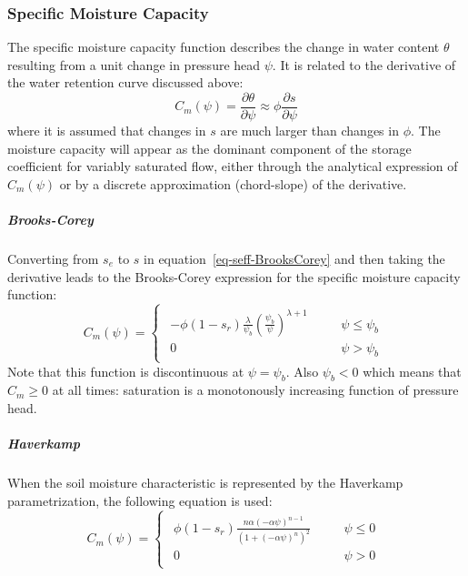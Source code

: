 \documentclass[fleqn]{article}
\begin{document}
\subsubsection{Specific Moisture Capacity}
The specific moisture capacity function describes the change in water content
$\theta$ resulting from a unit change in pressure head $\psi$. It is related to the derivative of the water retention curve discussed above:
\begin{equation}
  C_m(\psi) = \frac{\partial \theta}{\partial \psi} \approx
  \phi \frac{\partial s}{\partial \psi}
\end{equation}
where it is assumed that changes in $s$ are much larger than changes in $\phi$.
The moisture capacity will appear as the dominant component of the storage
coefficient for variably saturated flow, either through the analytical expression
of $C_m(\psi)$ or by a discrete approximation (chord-slope) of the derivative.

\subparagraph{Brooks-Corey}
Converting from $s_e$ to $s$ in equation~\ref{eq-seff-BrooksCorey} and then taking the derivative leads to the Brooks-Corey expression for the specific moisture capacity function:
\begin{equation}
  C_m(\psi) =
  \begin{cases}
    \begin{aligned}
      - \phi ( 1 - s_r) \frac{\lambda}{\psi_b}
      \left(\frac{\psi_b}{\psi}\right)^{\lambda + 1} & \quad & \psi \leq \psi_b \\
      0                                              & \quad & \psi > \psi_b
    \end{aligned}
  \end{cases}
  \label{eq-Cm-BrooksCorey}
\end{equation}
Note that this function is discontinuous at $\psi = \psi_b$. Also
$\psi_b < 0$ which means that $C_m \geq 0$ at all times: saturation is a
monotonously increasing function of pressure head.
\subparagraph{Haverkamp}
When the soil moisture characteristic is represented by the Haverkamp
parametrization, the following equation is used:
\begin{equation}
  C_m(\psi) =
  \begin{cases}
    \begin{aligned}
      \phi ( 1 - s_r)
      \frac
      {
        n \alpha (-\alpha\psi)^{n-1}
      }
      {
        \left( 1 + \left( -\alpha\psi \right)^{n} \right)^2
      }
        & \quad & \psi \leq 0 \\
      0 & \quad & \psi > 0
    \end{aligned}
  \end{cases}
  \label{eq-Cm-Haverkamp}
\end{equation}
\end{document}
